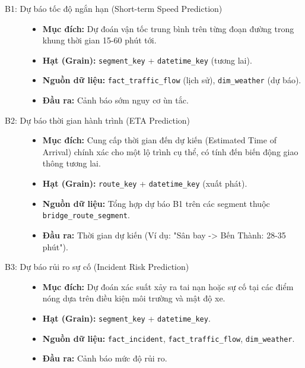 \begin{description}
    \item[B1: Dự báo tốc độ ngắn hạn (Short-term Speed Prediction)]\hfill
    \begin{itemize}
        \item \textbf{Mục đích:} Dự đoán vận tốc trung bình trên từng đoạn đường trong khung thời gian 15-60 phút tới.
        \item \textbf{Hạt (Grain):} \texttt{segment\_key} + \texttt{datetime\_key} (tương lai).
        \item \textbf{Nguồn dữ liệu:} \texttt{fact\_traffic\_flow} (lịch sử), \texttt{dim\_weather} (dự báo).
        \item \textbf{Đầu ra:} Cảnh báo sớm nguy cơ ùn tắc.
    \end{itemize}

    \item[B2: Dự báo thời gian hành trình (ETA Prediction)]\hfill
    \begin{itemize}
        \item \textbf{Mục đích:} Cung cấp thời gian đến dự kiến (Estimated Time of Arrival) chính xác cho một lộ trình cụ thể, có tính đến biến động giao thông tương lai.
        \item \textbf{Hạt (Grain):} \texttt{route\_key} + \texttt{datetime\_key} (xuất phát).
        \item \textbf{Nguồn dữ liệu:} Tổng hợp dự báo B1 trên các segment thuộc \texttt{bridge\_route\_segment}.
        \item \textbf{Đầu ra:} Thời gian dự kiến (Ví dụ: "Sân bay -> Bến Thành: 28-35 phút").
    \end{itemize}

    \item[B3: Dự báo rủi ro sự cố (Incident Risk Prediction)]\hfill
    \begin{itemize}
        \item \textbf{Mục đích:} Dự đoán xác suất xảy ra tai nạn hoặc sự cố tại các điểm nóng dựa trên điều kiện môi trường và mật độ xe.
        \item \textbf{Hạt (Grain):} \texttt{segment\_key} + \texttt{datetime\_key}.
        \item \textbf{Nguồn dữ liệu:} \texttt{fact\_incident}, \texttt{fact\_traffic\_flow}, \texttt{dim\_weather}.
        \item \textbf{Đầu ra:} Cảnh báo mức độ rủi ro.
    \end{itemize}
\end{description}

